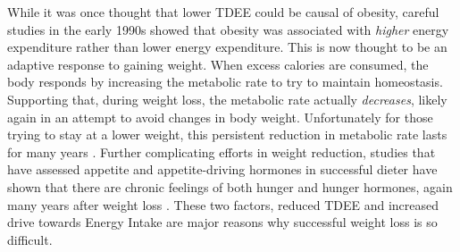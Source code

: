\documentclass{tufte-handout}
\begin{document}
While it was once thought that lower TDEE could be causal of obesity, careful studies in the early 1990s showed that obesity was associated with \emph{higher} energy expenditure rather than lower energy expenditure\cite{Ravussin1982}.  This is now thought to be an adaptive response to gaining weight.  When excess calories are consumed, the body responds by increasing the metabolic rate to try to maintain homeostasis.  Supporting that, during weight loss, the metabolic rate actually \emph{decreases}, likely again in an attempt to avoid changes in body weight\cite{Leibel1995a}.  Unfortunately for those trying to stay at a lower weight, this persistent reduction in metabolic rate lasts for many years \cite{Rosenbaum2008}.  Further complicating efforts in weight reduction, studies that have assessed appetite and appetite-driving hormones in successful dieter have shown that there are chronic feelings of both hunger and hunger hormones, again many years after weight loss \cite{Sumithran2011}.  These two factors, reduced TDEE and increased drive towards Energy Intake are major reasons why successful weight loss is so difficult.




\end{document}
